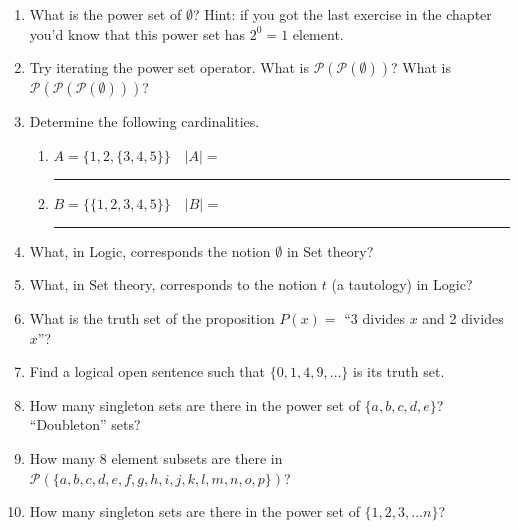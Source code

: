 \begin{enumerate}
\item What is the power set of $\emptyset$?  Hint: if you got the last exercise
in the chapter you'd know that this power set has $2^0 = 1$ element.


\item Try iterating the power set operator.  What is ${\mathcal P}({\mathcal P}(\emptyset))$?  What is ${\mathcal P}({\mathcal P}({\mathcal P}(\emptyset)))$?


\item Determine the following cardinalities.
  \begin{enumerate}
    \item $A = \{ 1, 2, \{3, 4, 5\}\} \quad |A| = $\rule{36pt}{1pt}
    \item $B = \{ \{1, 2, 3, 4, 5\} \} \quad |B| = $\rule{36pt}{1pt}  
  \end{enumerate}


\item What, in Logic, corresponds the notion $\emptyset$ in Set theory?


\item What, in Set theory, corresponds to the notion $t$ (a tautology) in Logic?


\item What is the truth set of the proposition $P(x) = $ ``3 divides $x$ and 2 divides $x$''?


\item Find a logical open sentence such that $\{0, 1, 4, 9, \ldots \}$ is
its truth set.


\item How many singleton sets are there in the power set of 
$\{a,b,c,d,e\}$?  ``Doubleton'' sets?


\item How many 8 element subsets are there in
${\mathcal P}(\{a,b,c,d,e,f,g,h,i,j,k,l,m,n,o,p\})$?


\item How many singleton sets are there in the power set of 
$\{1,2,3, \ldots n\}$?


\end{enumerate}




